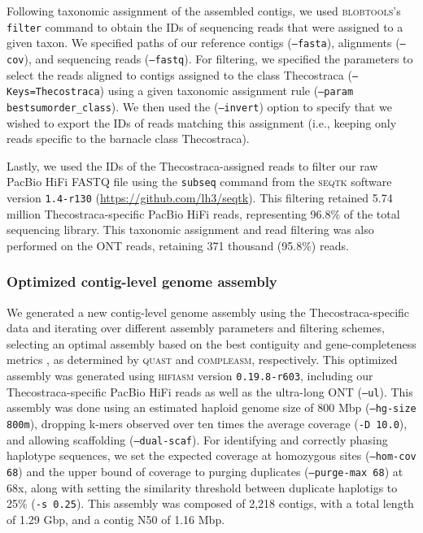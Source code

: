 \documentclass[11pt]{article}
\begin{document}
Following taxonomic assignment of the assembled contigs, we used
\textsc{blobtools}'s \texttt{filter} command to obtain the IDs of sequencing
reads that were assigned to a given taxon. We specified paths of our reference
contigs (\texttt{--fasta}), alignments (\texttt{--cov}), and sequencing reads
(\texttt{--fastq}). For filtering, we specified the parameters to select the reads
aligned to contigs assigned to the class Thecostraca (\texttt{--Keys=Thecostraca})
using a given taxonomic assignment rule (\texttt{--param bestsumorder\_class}). We
then used the (\texttt{--invert}) option to specify that we wished to export the
IDs of reads matching this assignment (i.e., keeping only reads specific to the
barnacle class Thecostraca).
\vspace{0.2cm}

Lastly, we used the IDs of the Thecostraca-assigned reads to filter our raw
PacBio HiFi FASTQ file using the \texttt{subseq} command from the \textsc{seqtk}
software version \texttt{1.4-r130} (\url{https://github.com/lh3/seqtk}). This
filtering retained 5.74 million Thecostraca-specific PacBio HiFi reads, representing
96.8\% of the total sequencing library. This taxonomic assignment and read
filtering was also performed on the ONT reads, retaining 371 thousand (95.8\%)
reads.

\subsubsection*{Optimized contig-level genome assembly}\label{sec:methods_optimized_assembly}

We generated a new contig-level genome assembly using the Thecostraca-specific
data and iterating over different assembly parameters and filtering schemes,
selecting an optimal assembly based on the best contiguity and gene-completeness
metrics \citep{rayamajhi_evaluating_2022}, as determined by \textsc{quast} and
\textsc{compleasm}, respectively.
This optimized assembly was generated using \textsc{hifiasm} version \texttt{0.19.8-r603},
including our Thecostraca-specific PacBio HiFi reads as well as the ultra-long ONT
(\texttt{--ul}).
This assembly was done using an estimated haploid genome size of 800 Mbp
(\texttt{--hg-size 800m}), dropping k-mers observed over ten times the average coverage
(\texttt{-D 10.0}), and allowing scaffolding (\texttt{--dual-scaf}).
For identifying and correctly phasing haplotype sequences, we set the expected coverage
at homozygous sites (\texttt{--hom-cov 68}) and the upper bound of coverage to purging
duplicates (\texttt{--purge-max 68}) at 68x, along with setting the similarity threshold
between duplicate haplotigs to 25\% (\texttt{-s 0.25}).
This assembly was composed of 2,218 contigs, with a total length of 1.29 Gbp, and a contig
N50 of 1.16 Mbp.
\vspace{0.2cm}
\end{document}
